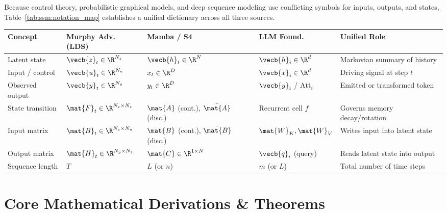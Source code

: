 \documentclass[../../../../master.tex]{subfiles}
\begin{document}
\begin{crossbook}
\label{tab:ssm:notation}
Because control theory, probabilistic graphical models, and deep sequence modeling use conflicting symbols for inputs, outputs, and states, Table~\ref{tab:ssm:notation_map} establishes a unified dictionary across all three sources.
\vspace{0.4em}
\begin{center}
\small
\begin{tabularx}{\textwidth}{@{}l l l l X@{}}
\toprule
\textbf{Concept} & \textbf{Murphy Adv. (LDS)} & \textbf{Mamba / S4} & \textbf{LLM Found.} & \textbf{Unified Role} \\
\midrule
Latent state & $\vecb{z}_t \in \R^{N_z}$ & $\vecb{h}_t \in \R^{N}$ & $\vecb{h}_i \in \R^d$ & Markovian summary of history \\
Input / control & $\vecb{u}_t \in \R^{N_u}$ & $x_t \in \R^D$ & $\vecb{x}_i \in \R^d$ & Driving signal at step $t$ \\
Observed output & $\vecb{y}_t \in \R^{N_y}$ & $y_t \in \R^D$ & $\vecb{y}_i$ / $\mathrm{Att}_i$ & Emitted or transformed token \\
State transition & $\mat{F}_t \in \R^{N_z \times N_z}$ & $\mat{A}$ (cont.), $\bar{\mat{A}}$ (disc.) & Recurrent cell $f$ & Governs memory decay/rotation \\
Input matrix & $\mat{B}_t \in \R^{N_z \times N_u}$ & $\mat{B}$ (cont.), $\bar{\mat{B}}$ (disc.) & $\mat{W}_K, \mat{W}_V$ & Writes input into latent state \\
Output matrix & $\mat{H}_t \in \R^{N_y \times N_z}$ & $\mat{C} \in \R^{1 \times N}$ & $\vecb{q}_i$ (query) & Reads latent state into output \\
Sequence length & $T$ & $L$ (or $n$) & $m$ (or $L$) & Total number of time steps \\
\bottomrule
\end{tabularx}
\end{center}
\label{tab:ssm:notation_map}
\end{crossbook}

\section{Core Mathematical Derivations \& Theorems}\label{sec:ssm:derivations}
\end{document}
